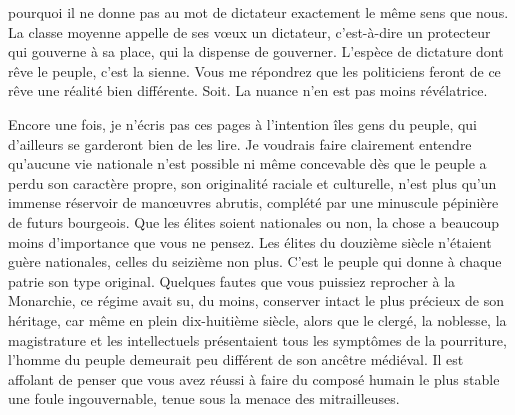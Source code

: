 \documentclass[french,twoside]{book} %
\begin{document}
pourquoi il ne donne pas au mot de dictateur exactement le même sens que nous. La classe moyenne appelle de ses vœux un dictateur, c’est-à-dire un protecteur qui gouverne à sa place, qui la dispense de gouverner. L’espèce de dictature dont rêve le peuple, c’est la sienne. Vous me répondrez que les politiciens feront de ce rêve une réalité bien différente. Soit. La nuance n’en est pas moins révélatrice.\par
Encore une fois, je n’écris pas ces pages à l’intention îles gens du peuple, qui d’ailleurs se garderont bien de les lire. Je voudrais faire clairement entendre qu’aucune vie nationale n’est possible ni même concevable dès que le peuple a perdu son caractère propre, son originalité raciale et culturelle, n’est plus qu’un immense réservoir de manœuvres abrutis, complété par une minuscule pépinière de futurs bourgeois. Que les élites soient nationales ou non, la chose a beaucoup moins d’importance que vous ne pensez. Les élites du douzième siècle n’étaient guère nationales, celles du seizième non plus. C’est le peuple qui donne à chaque patrie son type original. Quelques fautes que vous puissiez reprocher à la Monarchie, ce régime avait su, du moins, conserver intact le plus précieux de son héritage, car même en plein dix-huitième siècle, alors que le clergé, la noblesse, la magistrature et les intellectuels présentaient tous les symptômes de la pourriture, l’homme du peuple demeurait peu différent de son ancêtre médiéval. Il est affolant de penser que vous avez réussi à faire du composé humain le plus stable une foule ingouvernable, tenue sous la menace des mitrailleuses.\par
\bigbreak
\end{document}
